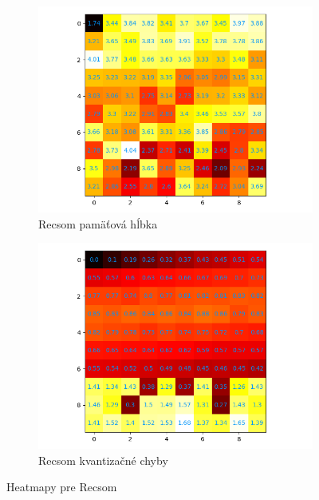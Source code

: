 \begin{figure}[H]
    \centering
    \begin{subfigure}{.5\textwidth}
        \centering
        \includegraphics[width=\linewidth]{assets/recsom_memory_span}
        \caption{Recsom pamäťová hĺbka}
        \label{fig:sub1}
    \end{subfigure}%
    \begin{subfigure}{.5\textwidth}
        \centering
        \includegraphics[width=\linewidth]{assets/recsom_quantization_errors}
        \caption{Recsom kvantizačné chyby}
        \label{fig:sub2}
    \end{subfigure}
    \caption{Heatmapy pre Recsom}
    \label{fig:test}
\end{figure}

